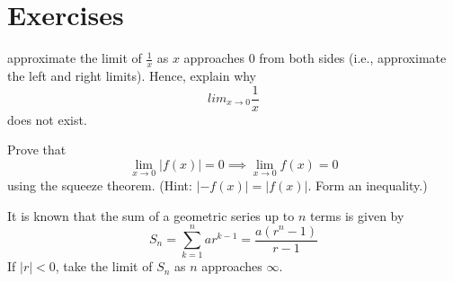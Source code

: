 \newpage
\section{Exercises}

\begin{exercise}
    approximate the limit of $\frac{1}{x}$ as $x$ approaches $0$ from both sides
    (i.e., approximate the left and right limits). Hence, explain why
    \[lim_{x \to 0} \frac{1}{x}\]
    does not exist.
\end{exercise}

\begin{exercise}
    Prove that \[\lim_{x \to 0} |f(x)| = 0 \implies \lim_{x \to 0} f(x) = 0\]
    using the squeeze theorem. (Hint: $|-f(x)| = |f(x)|$. Form an inequality.)
\end{exercise}

\begin{exercise}
    It is known that the sum of a geometric series up to $n$ terms is given by
    \[S_n = \sum_{k=1}^n ar^{k - 1} = \frac{a(r^n - 1)}{r - 1}\]
    If $|r| < 0$, take the limit of $S_n$ as $n$ approaches $\infty$.
\end{exercise}